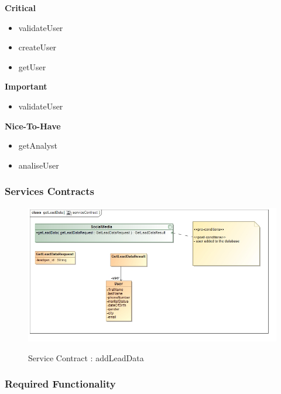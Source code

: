 \documentclass{article}
\begin{document}
		\begin{flushleft}
			\textbf{Critical}
				\begin{itemize}
	  				\item validateUser
	  				\item createUser
	  				\item getUser
				\end{itemize}
			\textbf{Important}
				\begin{itemize}
	  				\item validateUser
				\end{itemize}

			\textbf{Nice-To-Have}
				\begin{itemize}
	  				\item getAnalyst
	  				\item analiseUser
				\end{itemize}
		\end{flushleft}

		\subsubsection{Services Contracts}

		\begin{figure}[H]
		\includegraphics[width=\textwidth]{images/class__getLeadData__serviceContract.jpg}  \\
		\caption{Service Contract : addLeadData}
		\end{figure}

		\subsubsection{Required Functionality}
\end{document}
